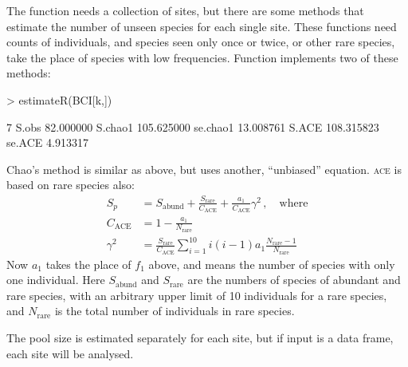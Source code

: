 \documentclass[a4paper,10pt,twocolumn]{article}
\begin{document}
The  function needs a collection of sites, but there
are some methods that estimate the number of unseen species for each
single site.  These functions need counts of individuals, and species
seen only once or twice, or other rare species, take the place of
species with low frequencies.  Function  implements
two of these methods:
\begin{Schunk}
\begin{Sinput}
> estimateR(BCI[k,])
\end{Sinput}
\begin{Soutput}
                  7
S.obs     82.000000
S.chao1  105.625000
se.chao1  13.008761
S.ACE    108.315823
se.ACE     4.913317
\end{Soutput}
\end{Schunk}
Chao's method is similar as above, but uses another, ``unbiased''
equation. \textsc{ace} is based on rare species also:
\begin{equation}
\begin{split}
S_p &= S_\mathrm{abund} + \frac{S_\mathrm{rare}}{C_\mathrm{ACE}} +
\frac{a_1}{C_\mathrm{ACE}} \gamma^2\, , \quad \text{where}\\
C_\mathrm{ACE} &= 1 - \frac{a_1}{N_\mathrm{rare}}\\
\gamma^2 &= \frac{S_\mathrm{rare}}{C_\mathrm{ACE}} \sum_{i=1}^{10} i
(i-1) a_1 \frac{N_\mathrm{rare} - 1}{N_\mathrm{rare}}
\end{split}
\end{equation}
Now $a_1$ takes the place of $f_1$ above, and means the number of
species with only one individual.
Here $S_\mathrm{abund}$ and $S_\mathrm{rare}$ are the numbers of
species of abundant and rare species, with an arbitrary upper limit of
10 individuals for a rare species, and $N_\mathrm{rare}$ is the total
number of individuals in rare species.

The pool size
is estimated separately for each site, but if input is a data frame,
each site will be analysed.
\end{document}
